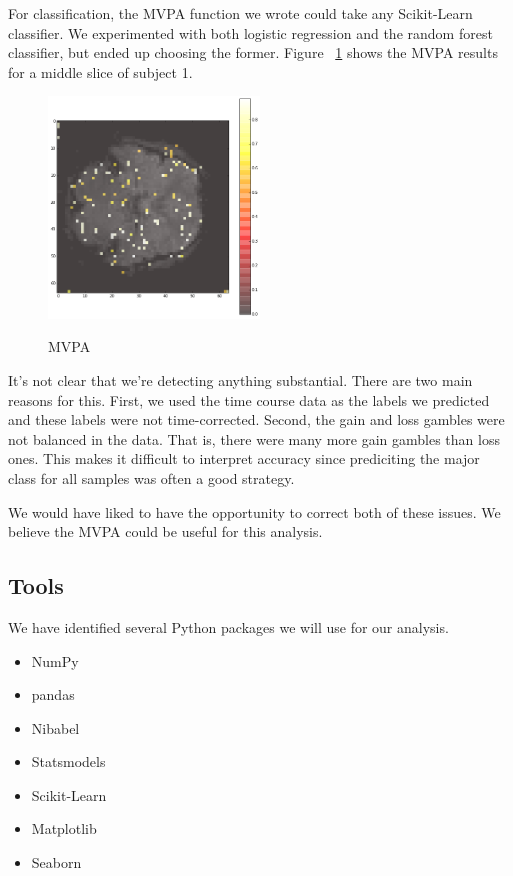 \documentclass[11pt]{article}
\begin{document}
For classification, the MVPA function we wrote could take any Scikit-Learn
classifier. We experimented with both logistic regression and the random forest
classifier, but ended up choosing the former. Figure ~\ref{fig:mvpa} shows the
MVPA results for a middle slice of subject 1.

\begin{figure}[h]
\caption{MVPA}
\centering
\includegraphics[width=0.5\textwidth]{mvpa.png}
\label{fig:mvpa}
\end{figure}

It's not clear that we're detecting anything substantial. There are two main
reasons for this. First, we used the time course data as the labels we
predicted and these labels were not time-corrected. Second, the gain and loss
gambles were not balanced in the data. That is, there were many more gain
gambles than loss ones. This makes it difficult to interpret accuracy since
prediciting the major class for all samples was often a good strategy.

We would have liked to have the opportunity to correct both of these issues. We
believe the MVPA could be useful for this analysis.

\subsection{Tools}

We have identified several Python packages we will use for our analysis.

\begin{itemize}
  \item{NumPy}
  \item{pandas}
  \item{Nibabel}
  \item{Statsmodels}
  \item{Scikit-Learn}
  \item{Matplotlib}
  \item{Seaborn}
\end{itemize}
\end{document}

